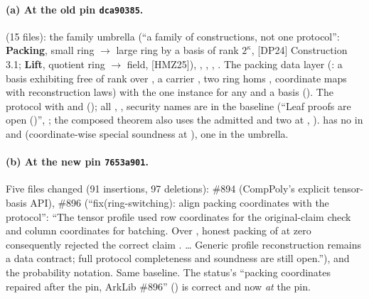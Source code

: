 \paragraph{(a) At the old pin \texttt{dca90385}.}
 (15 files): the family umbrella  (``a family
of constructions, not one protocol'': \textbf{Packing}, small ring $\to$ large ring by a basis of
rank $2^\kappa$, [DP24] Construction 3.1; \textbf{Lift}, quotient ring $\to$ field, [HMZ25]),
, ,
,
. The packing data layer
 (: a basis exhibiting 
free of rank  over , a carrier , two ring homs
, coordinate maps with reconstruction laws) with the one instance
 for any \code{[Field K] [Field L] [Algebra K L]} and a basis
 (). The protocol
with  and
 (); all
, ,  security
names are in the baseline (``Leaf proofs are open ()'', ; the
composed theorem also uses the admitted  and
two  at , ).  has no  in
 and  (coordinate-wise special soundness at
), one in the umbrella.

\paragraph{(b) At the new pin \texttt{7653a901}.}
Five files changed (91 insertions, 97 deletions): \#894 (CompPoly's explicit tensor-basis API),
\#896 (``fix(ring-switching): align packing coordinates with the protocol'': ``The tensor profile
used row coordinates for the original-claim check and column coordinates for batching. Over
, honest packing of  at zero consequently rejected the
correct claim . \ldots{} Generic profile reconstruction remains a data contract; full
protocol completeness and soundness are still open.''), and the probability notation. Same
baseline. The status's ``packing coordinates repaired after the pin, ArkLib \#896''
() is correct and now \emph{at} the pin.

